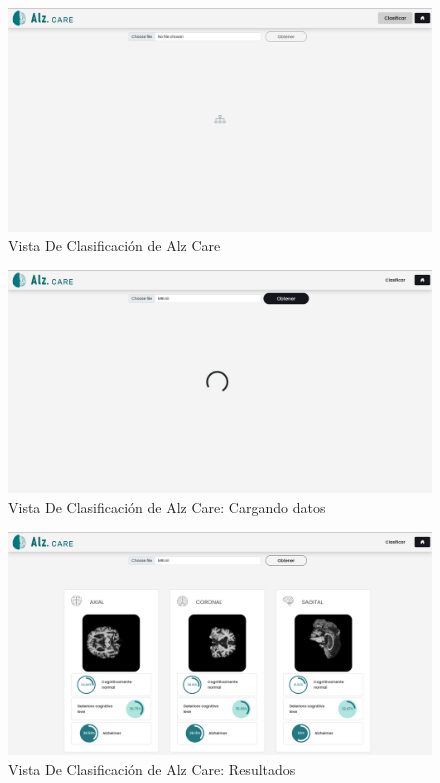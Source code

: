 \begin{figure}[H]
    \centering
    \includegraphics[width=\textwidth]{./imgs/app/final-cp}
    \caption{Vista De Clasificación de Alz Care}
    \label{fig:final-cp-page}
\end{figure}

\begin{figure}[H]
    \centering
    \includegraphics[width=\textwidth]{./imgs/app/final-cp-l}
    \caption{Vista De Clasificación de Alz Care: Cargando datos}
    \label{fig:final-cp-l-page}
\end{figure}

\begin{figure}[H]
    \centering
    \includegraphics[width=\textwidth]{./imgs/app/final-cp-r}
    \caption{Vista De Clasificación de Alz Care: Resultados}
    \label{fig:final-cp-r-page}
\end{figure}